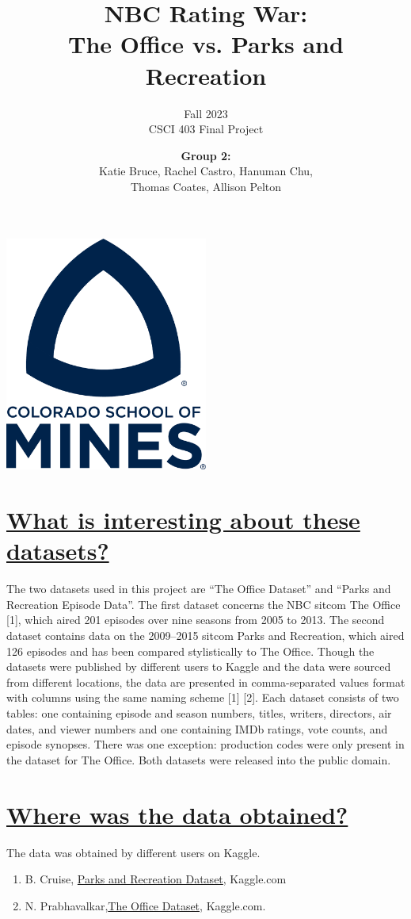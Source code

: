\documentclass{article}
\title{\textbf{NBC Rating War: \\The Office vs. Parks and Recreation}}
\author{Fall 2023 \\ CSCI 403  Final Project}
\date{\textbf{Group 2:} \\ Katie Bruce, Rachel Castro, Hanuman Chu, \\Thomas Coates, Allison Pelton}
\begin{document}
\maketitle

\begin{center}
    \includegraphics[width=0.5\textwidth]{Mines Stacked_1Color-blue.png}
\end{center}

\newpage

\section*{\underline{What is interesting about these datasets?}}
The two datasets used in this project are “The Office Dataset” and “Parks and Recreation Episode Data”. The first dataset concerns the NBC sitcom The Office [1], which aired 201 episodes over nine seasons from 2005 to 2013. The second dataset contains data on the 2009–2015 sitcom Parks and Recreation, which aired 126 episodes and has been compared stylistically to The Office. Though the datasets were published by different users to Kaggle and the data were sourced from different locations, the data are presented in comma-separated values format with columns using the same naming scheme [1] [2]. Each dataset consists of two tables: one containing episode and season numbers, titles, writers, directors, air dates, and viewer numbers and one containing IMDb ratings, vote counts, and episode synopses. There was one exception: production codes were only present in the dataset for The Office. Both datasets were released into the public domain. \\


\section*{\underline{Where was the data obtained?}}
The data was obtained by different users on Kaggle.\\
\begin{enumerate}
    \item B. Cruise,  \href{https://www.kaggle.com/datasets/bcruise/parks-and-recreation-episode-data}{Parks and Recreation Dataset}, Kaggle.com
    
    \item N. Prabhavalkar,\href{https://www.kaggle.com/datasets/nehaprabhavalkar/the-office-dataset}{The Office Dataset}, Kaggle.com.
\end{enumerate}
\end{document}
